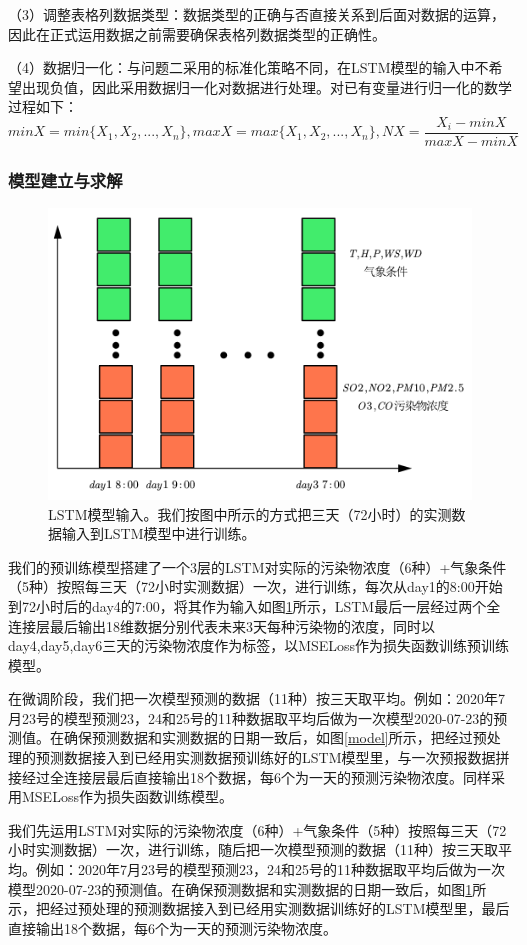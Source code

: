 \documentclass[bwprint]{gmcmthesis}
\numberwithin{figure}{section}
\begin{document}
（3）调整表格列数据类型：数据类型的正确与否直接关系到后面对数据的运算，因此在正式运用数据之前需要确保表格列数据类型的正确性。

（4）数据归一化：与问题二采用的标准化策略不同，在LSTM模型的输入中不希望出现负值，因此采用数据归一化对数据进行处理。对已有变量进行归一化的数学过程如下：
\begin{equation}
	minX = min\{X_1,X_2,...,X_n\},maxX = max\{X_1,X_2,...,X_n\},NX = \frac{X_i-minX}{maxX-minX}
\end{equation}

\subsubsection{模型建立与求解}
\begin{figure}[!h]
	\centering
	\includegraphics[width=.7\textwidth]{LSTM_input.png}
	\caption{LSTM模型输入。我们按图中所示的方式把三天（72小时）的实测数据输入到LSTM模型中进行训练。}
	\label{LSTM-INPUT}
\end{figure}

我们的预训练模型搭建了一个3层的LSTM对实际的污染物浓度（6种）+气象条件（5种）按照每三天（72小时实测数据）一次，进行训练，每次从day1的8:00开始到72小时后的day4的7:00，将其作为输入如图\ref{LSTM-INPUT}所示，LSTM最后一层经过两个全连接层最后输出18维数据分别代表未来3天每种污染物的浓度，同时以day4,day5,day6三天的污染物浓度作为标签，以MSELoss作为损失函数训练预训练模型。

在微调阶段，我们把一次模型预测的数据（11种）按三天取平均。例如：2020年7月23号的模型预测23，24和25号的11种数据取平均后做为一次模型2020-07-23的预测值。在确保预测数据和实测数据的日期一致后，如图\ref{model}所示，把经过预处理的预测数据接入到已经用实测数据预训练好的LSTM模型里，与一次预报数据拼接经过全连接层最后直接输出18个数据，每6个为一天的预测污染物浓度。同样采用MSELoss作为损失函数训练模型。

我们先运用LSTM对实际的污染物浓度（6种）+气象条件（5种）按照每三天（72小时实测数据）一次，进行训练，随后把一次模型预测的数据（11种）按三天取平均。例如：2020年7月23号的模型预测23，24和25号的11种数据取平均后做为一次模型2020-07-23的预测值。在确保预测数据和实测数据的日期一致后，如图\ref{LSTM-INPUT}所示，把经过预处理的预测数据接入到已经用实测数据训练好的LSTM模型里，最后直接输出18个数据，每6个为一天的预测污染物浓度。
\end{document}

